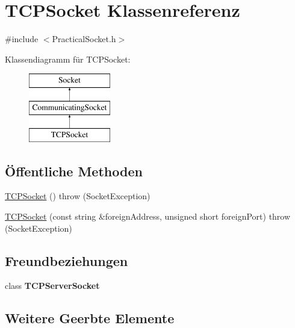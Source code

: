 \hypertarget{classTCPSocket}{\section{T\-C\-P\-Socket Klassenreferenz}
\label{classTCPSocket}
}


{\ttfamily \#include $<$Practical\-Socket.\-h$>$}

Klassendiagramm für T\-C\-P\-Socket\-:\begin{figure}[H]
\begin{center}
\leavevmode
\includegraphics[height=3.000000cm]{classTCPSocket}
\end{center}
\end{figure}
\subsection*{Öffentliche Methoden}
\begin{DoxyCompactItemize}
\item 
\hyperlink{classTCPSocket_a7a50427a401d1a6f3209d51818bad901}{T\-C\-P\-Socket} ()  throw (\-Socket\-Exception)
\item 
\hyperlink{classTCPSocket_a7b246b66f6dc3246ab2777b771e5f917}{T\-C\-P\-Socket} (const string \&foreign\-Address, unsigned short foreign\-Port)  throw (\-Socket\-Exception)
\end{DoxyCompactItemize}
\subsection*{Freundbeziehungen}
\begin{DoxyCompactItemize}
\item 
\hypertarget{classTCPSocket_ae8bcdc0d25881a17b23e557296236fa9}{class {\bfseries T\-C\-P\-Server\-Socket}}\label{classTCPSocket_ae8bcdc0d25881a17b23e557296236fa9}

\end{DoxyCompactItemize}
\subsection*{Weitere Geerbte Elemente}


